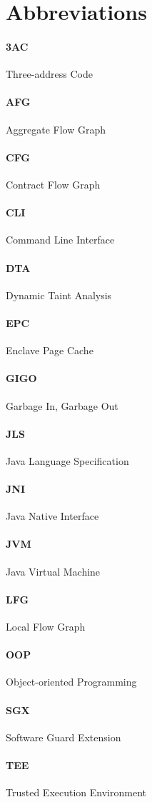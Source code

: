 \section{Abbreviations}
\paragraph{3AC} Three-address Code
\paragraph{AFG} Aggregate Flow Graph
\paragraph{CFG} Contract Flow Graph
\paragraph{CLI} Command Line Interface
\paragraph{DTA} Dynamic Taint Analysis
\paragraph{EPC} Enclave Page Cache
\paragraph{GIGO} Garbage In, Garbage Out
\paragraph{JLS} Java Language Specification
\paragraph{JNI} Java Native Interface
\paragraph{JVM} Java Virtual Machine
\paragraph{LFG} Local Flow Graph
\paragraph{OOP} Object-oriented Programming
\paragraph{SGX} Software Guard Extension
\paragraph{TEE} Trusted Execution Environment
